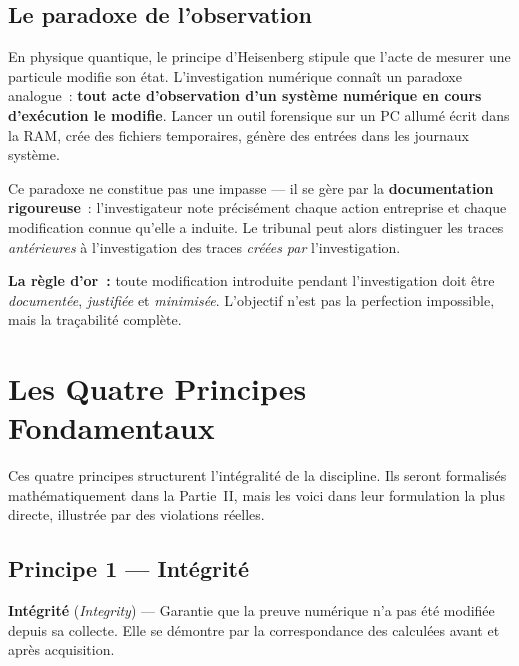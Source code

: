 \subsection{Le paradoxe de l'observation}

En physique quantique, le principe d'Heisenberg stipule que l'acte de mesurer
une particule modifie son état. L'investigation numérique connaît un paradoxe
analogue~: \textbf{tout acte d'observation d'un système numérique en cours
d'exécution le modifie}. Lancer un outil forensique sur un PC allumé écrit
dans la RAM, crée des fichiers temporaires, génère des entrées dans les
journaux système.

Ce paradoxe ne constitue pas une impasse --- il se gère par la
\textbf{documentation rigoureuse}~: l'investigateur note précisément chaque
action entreprise et chaque modification connue qu'elle a induite. Le tribunal
peut alors distinguer les traces \emph{antérieures} à l'investigation des
traces \emph{créées par} l'investigation.

\begin{boxinfo}
\textbf{La règle d'or~:} toute modification introduite pendant l'investigation
doit être \emph{documentée}, \emph{justifiée} et \emph{minimisée}. L'objectif
n'est pas la perfection impossible, mais la traçabilité complète.
\end{boxinfo}

\section{Les Quatre Principes Fondamentaux}

Ces quatre principes structurent l'intégralité de la discipline. Ils seront
formalisés mathématiquement dans la Partie~II, mais les voici dans leur
formulation la plus directe, illustrée par des violations réelles.

\subsection{Principe 1 --- Intégrité}
\label{subsec:principe-integrite}

\begin{boxdef}
\textbf{Intégrité} (\textit{Integrity}) ---
Garantie que la preuve numérique n'a pas été modifiée depuis sa collecte.
Elle se démontre par la correspondance des  calculées avant et après acquisition.
\end{boxdef}


